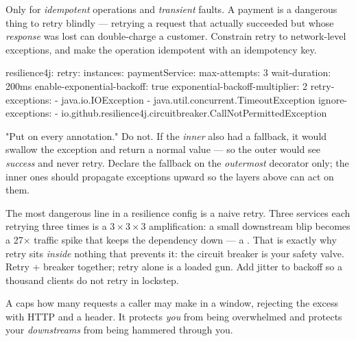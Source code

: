 Only for \emph{idempotent} operations and \emph{transient} faults. A payment  is a dangerous thing to retry blindly --- retrying a request that actually succeeded but whose \emph{response} was lost can double-charge a customer. Constrain retry to network-level exceptions, and make the operation idempotent with an idempotency key.

\begin{yamlbox}
resilience4j:
  retry:
    instances:
      paymentService:
        max-attempts: 3
        wait-duration: 200ms
        enable-exponential-backoff: true
        exponential-backoff-multiplier: 2
        retry-exceptions:
          - java.io.IOException
          - java.util.concurrent.TimeoutException
        ignore-exceptions:
          - io.github.resilience4j.circuitbreaker.CallNotPermittedException
\end{yamlbox}

\begin{misconception}
"Put  on every annotation." Do not. If the \emph{inner}  also had a fallback, it would swallow the exception and return a normal value --- so the outer  would see \emph{success} and never retry. Declare the fallback on the \emph{outermost} decorator only; the inner ones should propagate exceptions upward so the layers above can act on them.
\end{misconception}

\begin{seniornote}
The most dangerous line in a resilience config is a naive retry. Three services each retrying three times is a $3\times3\times3$ amplification: a small downstream blip becomes a 27$\times$ traffic spike that keeps the dependency down --- a . That is exactly why retry sits \emph{inside} nothing that prevents it: the circuit breaker is your safety valve. Retry + breaker together; retry alone is a loaded gun. Add jitter to backoff so a thousand clients do not retry in lockstep.
\end{seniornote}


 A  caps how many requests a caller may make in a window, rejecting the excess with HTTP  and a  header. It protects \emph{you} from being overwhelmed and protects your \emph{downstreams} from being hammered through you.

